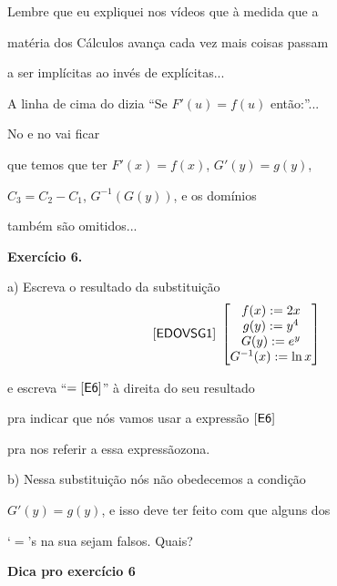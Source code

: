 \documentclass[oneside,12pt]{article}
\begin{document}
\newpage


Lembre que eu expliquei nos vídeos que à medida que a

matéria dos Cálculos avança cada vez mais coisas passam

a ser implícitas ao invés de explícitas...

\msk

A linha de cima do  dizia ``Se $F'(u) = f(u)$ então:''...

\msk

No  e no  vai ficar 

que temos que ter $F'(x) = f(x)$, $G'(y) = g(y)$,

$C_3 = C_2 - C_1$, $G^{-1}(G(y))$, e  os domínios

também são omitidos...

\newpage


{\bf Exercício 6.}

\def\SubstExSix{
  \bmat{ f(x) := 2x \\
         g(y) := y^4 \\
         G(y) := e^y \\
         G^{-1}(x) := \ln x \\
       }
  }

a) Escreva o resultado da substituição 
%
$$\pfo{EDOVSG1} \; \SubstExSix
$$

e escreva ``$= \mathsf{[E6]}$'' à direita do seu resultado

pra indicar que nós vamos usar a expressão $\mathsf{[E6]}$

pra nos referir a essa expressãozona.

\msk

b) Nessa substituição nós não obedecemos a condição

$G'(y) = g(y)$, e isso deve ter feito com que alguns dos

`$=$'s na sua  sejam falsos. Quais?


\newpage


{\bf Dica pro exercício 6}
\end{document}
